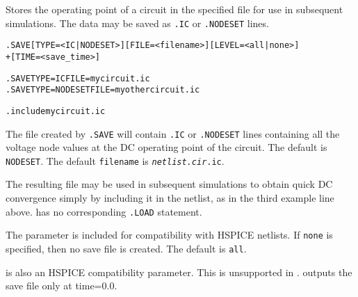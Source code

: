 



 
Stores the operating point of a circuit in the specified file for use in subsequent simulations.  The data may be saved as \texttt{.IC} or \texttt{.NODESET} lines.

\begin{Command}

\format
\begin{alltt}
.SAVE [TYPE=<IC|NODESET>] [FILE=<filename>] [LEVEL=<all|none>]
+ [TIME=<save\_time>]
\end{alltt}

\examples
\begin{alltt}
.SAVE TYPE=IC FILE=mycircuit.ic
.SAVE TYPE=NODESET FILE=myothercircuit.ic

.include mycircuit.ic
\end{alltt}

\comments

  The file created by \texttt{.SAVE} will contain \texttt{.IC} or
  \texttt{.NODESET} lines containing all the voltage node values at the DC
  operating point of the circuit. The default  is
  \texttt{NODESET}. The default \texttt{filename} is
  \texttt{\emph{netlist.cir}.ic}.
  
  The resulting file may be used in subsequent simulations to obtain quick DC
  convergence simply by including it in the netlist, as in the third example
  line above.  \Xyce{} has no corresponding \texttt{.LOAD} statement.
  
  The  parameter is included for compatibility with HSPICE
  netlists. If \texttt{none} is specified, then no save file is created. The
  default  is \texttt{all}.
  
   is also an HSPICE compatibility parameter. This is unsupported
  in \Xyce{}. \Xyce{} outputs the save file only at time=0.0.

\end{Command}

